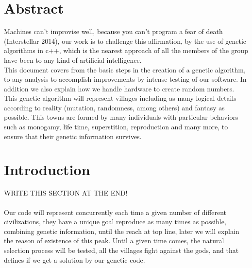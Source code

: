 \documentclass[twocolumn]{IEEEtran}
\begin{document}
\makeatletter
\def\markboth#1#2{\def\leftmark{\@IEEEcompsoconly{\sffamily}\MakeUppercase{\protect#1}}%
\def\rightmark{\@IEEEcompsoconly{\sffamily}\MakeUppercase{\protect#2}}}

\maketitle

\section{Abstract}

Machines can't improvise well, because you can't program a fear of death (Interstellar 2014), our work is to challenge this affirmation, by the use of genetic algorithms in c++, which is the nearest approach of all the members of the group have been to any kind of artificial intelligence.\\ 
This document covers from the basic steps in the creation of a genetic algorithm, to any analysis to accomplish improvements by intense testing of our software. In addition we also explain how we handle hardware to create random numbers\cite{21}.\\
This genetic algorithm will represent villages including as many logical details according to reality (mutation, randomness, among others) and fantasy as possible. This towns are formed by many individuals with particular behaviors such as monogamy, life time, superstition, reproduction and many more, to ensure that their genetic information survives.\cite{20} \cite{14} \cite{15}\\



\section{Introduction}
WRITE THIS SECTION AT THE END!\\ \\
Our code will represent concurrently each time a given number of different civilizations, they have a unique goal reproduce as many times as possible, combining genetic information, until the reach at top line, later we will explain the reason of existence of this peak. Until a given time comes, the natural selection process will be tested, all the villages fight against the gods, and that defines if we get a solution by our genetic code.
\end{document}
